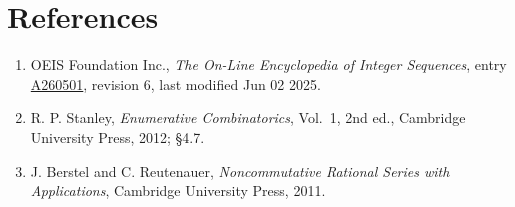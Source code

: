 \documentclass[11pt]{article}
\theoremstyle{definition}
\begin{document}
\section{References}

\begin{enumerate}

\item OEIS Foundation Inc., \emph{The On-Line Encyclopedia of Integer Sequences}, entry \href{https://oeis.org/A260501}{A260501}, revision 6, last modified Jun 02 2025.

\item R. P. Stanley, \emph{Enumerative Combinatorics}, Vol.~1, 2nd ed., Cambridge University Press, 2012; \S4.7.

\item J. Berstel and C. Reutenauer, \emph{Noncommutative Rational Series with Applications}, Cambridge University Press, 2011.

\end{enumerate}
\end{document}
